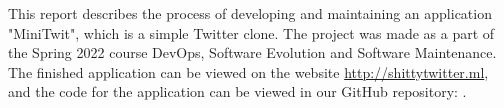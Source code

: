 This report describes the process of developing and maintaining an application "MiniTwit", which is a simple Twitter clone. The project was made as a part of the Spring 2022 course DevOps, Software Evolution and Software Maintenance. The finished application can be viewed on the website \href{http://shittytwitter.ml}{http://shittytwitter.ml}, and the code for the application can be viewed in our GitHub repository: \cite{repository}.